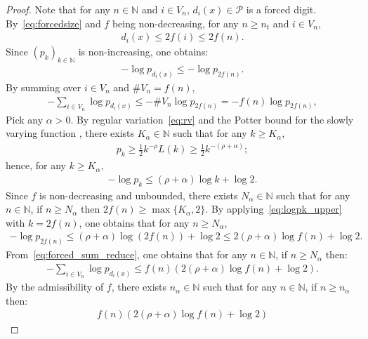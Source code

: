 \documentclass[12pt,reqno]{amsart}
\theoremstyle{definition}
\theoremstyle{plain}
\begin{document}
\begin{proof}
    Note that for any $n\in\mathbb{N}$ and $i\in V_n$, $d_i(x)\in\mathcal{P}$ is a forced digit. By~\eqref{eq:forcedsize} and $f$ being non-decreasing, for any $n\geq n_t$ and $i\in V_n$,
    \begin{align*}
        d_i(x)\leq 2f(i)\leq 2f(n).
    \end{align*}
    Since $(p_k)_{k\in\mathbb{N}}$ is non-increasing, one obtains:
    \begin{align*}
        -\log p_{d_i(x)} \leq -\log p_{2f(n)}.
    \end{align*}
    By summing over $i\in V_n$ and $\#V_n=f(n)$,
    \begin{align}\label{eq:forced_sum_reduce}
        -\sum_{i\in V_n} \log p_{d_i(x)}
        \leq-\#V_n \log p_{2f(n)}
        = -f(n)\log{p_{2f(n)}},
    \end{align}
    Pick any $\alpha>0$. By regular variation~\eqref{eq:rv} and the Potter bound for the slowly varying function \cite[Theorem 1.5.6]{BinghamGoldieTeugels1987}, there exists $K_\alpha\in\mathbb{N}$ such that for any $k\geq K_\alpha$,
    \begin{align*}
        p_k \geq \frac12 k^{-\rho}L(k)\geq \frac12 k^{-(\rho+\alpha)};
    \end{align*}
    hence, for any $k\geq K_\alpha$,
    \begin{align}\label{eq:logpk_upper}
        -\log p_k \leq (\rho+\alpha)\log k + \log 2.
    \end{align}
    Since $f$ is non-decreasing and unbounded, there exists $N_\alpha\in\mathbb{N}$ such that for any $n\in\mathbb{N}$, if $n\geq N_\alpha$ then $2f(n)\geq \max{\{K_\alpha,2\}}$. By applying~\eqref{eq:logpk_upper} with $k=2f(n)$, one obtains that for any $n\geq N_\alpha$,
    \begin{align*}
        -\log{p_{2f(n)}}
        \leq (\rho+\alpha)\log{(2f(n))}+\log 2
        \leq 2(\rho+\alpha)\log{f(n)}+\log 2.
    \end{align*}
    From~\eqref{eq:forced_sum_reduce}, one obtains that for any $n\in\mathbb{N}$, if $n\geq N_\alpha$ then:
    \begin{align*}
        - \sum_{i\in V_n}\log p_{d_i(x)}
        \leq f(n)\left(2(\rho+\alpha)\log{f(n)} + \log{2}\right).
    \end{align*}
    By the admissibility of $f$, there exists $n_\alpha\in\mathbb{N}$ such that for any $n\in\mathbb{N}$, if $n\geq n_\alpha$ then:
    \begin{align*}
        f(n)\left(2(\rho+\alpha)\log{f(n)} + \log{2}\right)

\end{align*}
\end{proof}
\end{document}
